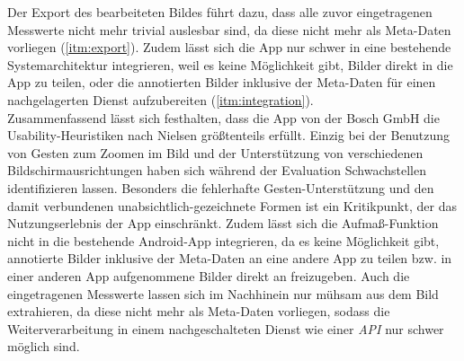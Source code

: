 Der Export des bearbeiteten Bildes führt dazu, dass alle zuvor eingetragenen Messwerte nicht mehr trivial auslesbar sind, da diese nicht mehr als Meta-Daten vorliegen (\autoref{itm:export}).
Zudem lässt sich die App nur schwer in eine bestehende Systemarchitektur integrieren, weil es keine Möglichkeit gibt, Bilder direkt in die App zu teilen, oder die annotierten Bilder inklusive der Meta-Daten für einen nachgelagerten Dienst aufzubereiten (\autoref{itm:integration}). \\

Zusammenfassend lässt sich festhalten, dass die App \mm{} von der Bosch GmbH die Usability-Heuristiken nach Nielsen größtenteils erfüllt.
Einzig bei der Benutzung von Gesten zum Zoomen im Bild und der Unterstützung von verschiedenen Bildschirmausrichtungen haben sich während der Evaluation Schwachstellen identifizieren lassen.
Besonders die fehlerhafte Gesten-Unterstützung und den damit verbundenen unabsichtlich-gezeichnete Formen ist ein Kritikpunkt, der das Nutzungserlebnis der App einschränkt.
Zudem lässt sich die Aufmaß-Funktion nicht in die bestehende Android-App integrieren, da es keine Möglichkeit gibt, annotierte Bilder inklusive der Meta-Daten an eine andere App zu teilen bzw. in einer anderen App aufgenommene Bilder direkt an \mm{} freizugeben.
Auch die eingetragenen Messwerte lassen sich im Nachhinein nur mühsam aus dem Bild extrahieren, da diese nicht mehr als Meta-Daten vorliegen, sodass die Weiterverarbeitung in einem nachgeschalteten Dienst wie einer \emph{API} nur schwer möglich sind.

